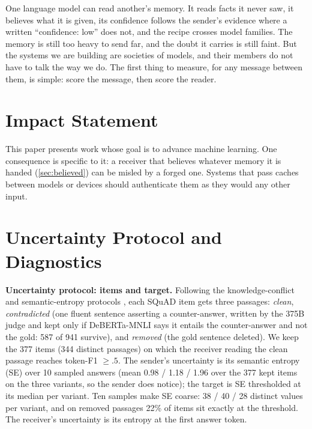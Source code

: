 \documentclass{article}
\begin{document}
One language model can read another's memory. It reads facts it never saw, it believes what it is given, its confidence follows the sender's evidence where a written ``confidence: low'' does not, and the recipe crosses model families. The memory is still too heavy to send far, and the doubt it carries is still faint. But the systems we are building are societies of models, and their members do not have to talk the way we do. The first thing to measure, for any message between them, is simple: score the message, then score the reader.

\section*{Impact Statement}

This paper presents work whose goal is to advance machine learning. One consequence is specific to it: a receiver that believes whatever memory it is handed (\cref{sec:believed}) can be misled by a forged one. Systems that pass caches between models or devices should authenticate them as they would any other input.




\newpage
\appendix
\onecolumn

\section{Uncertainty Protocol and Diagnostics}
\label{app:protocol}

\textbf{Uncertainty protocol: items and target.} Following the knowledge-conflict and semantic-entropy protocols \citep{longpre2021entity,xie2023adaptive,farquhar2024detecting}, each SQuAD item gets three passages: \emph{clean}, \emph{contradicted} (one fluent sentence asserting a counter-answer, written by the 375B judge and kept only if DeBERTa-MNLI says it entails the counter-answer and not the gold: 587 of 941 survive), and \emph{removed} (the gold sentence deleted). We keep the 377 items (344 distinct passages) on which the receiver reading the clean passage reaches token-F1 $\ge .5$. The sender's uncertainty is its semantic entropy (SE) over 10 sampled answers (mean 0.98 / 1.18 / 1.96 over the 377 kept items on the three variants, so the sender does notice); the target is SE thresholded at its median per variant. Ten samples make SE coarse: 38 / 40 / 28 distinct values per variant, and on removed passages 22\% of items sit exactly at the threshold. The receiver's uncertainty is its entropy at the first answer token.
\end{document}
